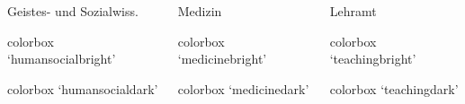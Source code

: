 \documentclass[german,notoc,draft]{tudbeamer}%
\begin{document}
\begin{frame}
\begin{columns}
\begin{column}{.33\textwidth}
			Geistes- und Sozialwiss.
			\begin{beamercolorbox}[wd=0.9\textwidth,sep=1em]{colorbox}
				\centering `humansocialbright'
		    \end{beamercolorbox}
			\begin{beamercolorbox}[wd=0.9\textwidth,sep=1em]{colorbox}
				\centering `humansocialdark'
		    \end{beamercolorbox}
		\end{column}
		\hspace{-.1\textwidth}\begin{column}{.33\textwidth}
			Medizin
			\begin{beamercolorbox}[wd=0.9\textwidth,sep=1em]{colorbox}
				\centering `medicinebright'
		    \end{beamercolorbox}
			\begin{beamercolorbox}[wd=0.9\textwidth,sep=1em]{colorbox}
				\centering `medicinedark'
		    \end{beamercolorbox}
		\end{column}
		\hspace{-.1\textwidth}\begin{column}{.33\textwidth}
			Lehramt
			\begin{beamercolorbox}[wd=0.9\textwidth,sep=1em]{colorbox}
				\centering `teachingbright'
		    \end{beamercolorbox}
			\begin{beamercolorbox}[wd=0.9\textwidth,sep=1em]{colorbox}
				\centering `teachingdark'
		    \end{beamercolorbox}
		\end{column}
	\end{columns}


\end{frame}
\end{document}
